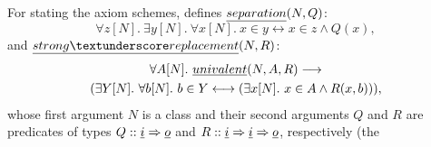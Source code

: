 For stating the axiom schemes,  defines
$\isa{separation}(N,Q)$:
\[
  \forall z[N].\ \exists y[N].\ \forall
  x[N].\ x\in y \longleftrightarrow x\in z \land Q(x),
\]
and $\isa{strong{\uscore}replacement}(N,R)$:
\begin{multline*}
  \forall
  A[N].\ \isa{univalent}(N,A,R) \longrightarrow \\
  (\exists Y[N].\ \forall b[N].\ b\in Y\longleftrightarrow (\exists x[N].\ x\in
  A \land R(x,b))),
\end{multline*}
whose first argument $N$ is a class and their second arguments $Q$ and
$R$ are predicates of types $Q :: \tyi \fun \tyo$ and $R ::
\tyi \fun \tyi \fun \tyo$, respectively (the 
